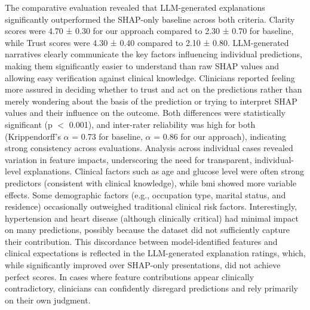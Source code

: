 \medskip
The comparative evaluation revealed that LLM-generated explanations significantly outperformed the SHAP-only baseline across both criteria. Clarity scores were 4.70 ± 0.30 for our approach compared to 2.30 ± 0.70 for baseline, while Trust scores were 4.30 ± 0.40 compared to 2.10 ± 0.80. LLM-generated narratives clearly communicate the key factors influencing individual predictions, making them significantly easier to understand than raw SHAP values and allowing easy verification against clinical knowledge. Clinicians reported feeling more assured in deciding whether to trust and act on the predictions rather than merely wondering about the basis of the prediction or trying to interpret SHAP values and their influence on the outcome. Both differences were statistically significant (p $<$ 0.001), and inter-rater reliability was high for both (Krippendorff's $\alpha$ = 0.73 for baseline, $\alpha$ = 0.86 for our approach), indicating strong consistency across evaluations. Analysis across individual cases revealed variation in feature impacts, underscoring the need for transparent, individual-level explanations. Clinical factors such as age and glucose level were often strong predictors (consistent with clinical knowledge), while bmi showed more variable effects. Some demographic factors (e.g., occupation type, marital status, and residence) occasionally outweighed traditional clinical risk factors. Interestingly, hypertension and heart disease (although clinically critical) had minimal impact on many predictions, possibly because the dataset did not sufficiently capture their contribution. This discordance between model-identified features and clinical expectations is reflected in the LLM-generated explanation ratings, which, while significantly improved over SHAP-only presentations, did not achieve perfect scores. In cases where feature contributions appear clinically contradictory, clinicians can confidently disregard predictions and rely primarily on their own judgment. 


